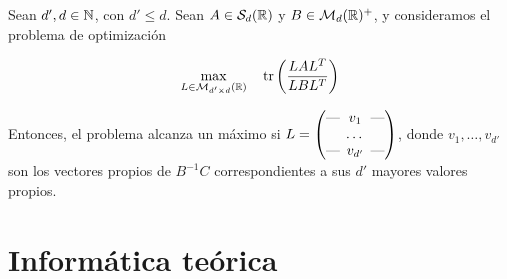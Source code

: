 \documentclass{book}
\begin{document}
\begin{thm} \label{thm:eigen_trace_ratio_opt}
	Sean $d',d \in \mathbb{N} $, con $d' \le d$. Sean $A \in \mathcal{S}_d(\mathbb{R})$ y $B \in \mathcal{M}_d(\mathbb{R})^+$, y consideramos el problema de optimización
	
	\begin{align*}
	\max_{L \in \mathcal{M}_{d'\times d}(\mathbb{R})} &\quad \operatorname{tr}\left(\frac{LAL^T}{LBL^T}\right)  \\
	\end{align*}
	
	Entonces, el problema alcanza un máximo si $L = \begin{pmatrix}
	\text{---} \hspace{-0.2cm} & v_1 & \hspace{-0.2cm} \text{---} \\
	& \dots &  \\
	\text{---} \hspace{-0.2cm} & v_{d'} & \hspace{-0.2cm} \text{---}
	\end{pmatrix}$, donde $v_1,\dots,v_{d'}$ son los vectores propios de $B^{-1}C$ correspondientes a sus $d'$ mayores valores propios.
	
	
\end{thm}












\part{Informática teórica}





 


\printbibliography
\nocite{*}
\end{document}
